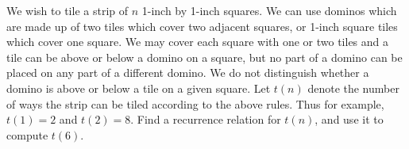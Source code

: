 We wish to tile a strip of $n$ 1-inch by 1-inch squares. We can use dominos
which are made up of two tiles which cover two adjacent squares, or 1-inch
square tiles which cover one square. We may cover each square with one or two
tiles and a tile can be above or below a domino on a square, but no part of a
domino can be placed on any part of a different domino. We do not distinguish
whether a domino is above or below a tile on a given square. Let $t(n)$ denote
the number of ways the strip can be tiled according to the above rules. Thus
for example, $t(1) = 2$ and $t(2) = 8$. Find a recurrence relation for $t(n)$,
and use it to compute $t(6)$.
